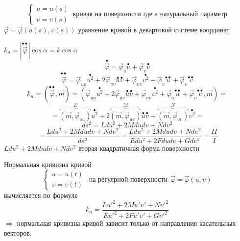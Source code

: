 \begin{define}
  $$
  \left\{
  \begin{array}{c}
    u = u(s) \\
    \upsilon = \upsilon(s)
  \end{array}
  \right. ~ \text{кривая на поверхности где $s$ натуральный параметр}
  $$
  $\vec \varphi = \vec \varphi(u(s), \upsilon(s))$ уравнение кривой в декартовой
  системе координат

  $k_n = |\stackrel{\bullet \bullet}{\vec \varphi}| \cos \alpha = k \cos \alpha$
  $$
  \stackrel{\bullet}{\vec \varphi} = \vec \varphi_u \stackrel{\bullet}{u} +
  \vec \varphi_{\upsilon} \stackrel{\bullet}{\upsilon}
  $$
  $$
  \stackrel{\bullet \bullet}{\vec \varphi} = \vec \varphi_{uu}
  \stackrel{\bullet}{u^2} + 2\vec \varphi_{u\upsilon}\stackrel{\bullet}{u}
  \stackrel{\bullet}{\upsilon} + \vec \varphi_{\upsilon \upsilon}
  \stackrel{\bullet}{\upsilon^2}
  + \vec \varphi_u \stackrel{\bullet \bullet}{u} +
  \vec \varphi_{\upsilon} \stackrel{\bullet \bullet}{\upsilon}
  $$
  $$
  k_n = (\stackrel{\bullet \bullet}{\vec \varphi}, \vec m) = (\vec \varphi_{uu}
  \stackrel{\bullet}{u^2} + 2\vec \varphi_{u\upsilon}\stackrel{\bullet}{u}
  \stackrel{\bullet}{\upsilon} + \vec \varphi_{\upsilon \upsilon}
  \stackrel{\bullet}{\upsilon^2}
  + \vec \varphi_u \stackrel{\bullet \bullet}{u} +
  \vec \varphi_{\upsilon} \stackrel{\bullet \bullet}{\upsilon}, \vec m) =
  $$
  $$
  = \overbrace{(\vec m, \vec \varphi_{uu})}^L \stackrel{\bullet}{u^2} +
  2\overbrace{(\vec m, \vec \varphi_{u\upsilon})}^M \stackrel{\bullet}{u}
  \stackrel{\bullet}{\upsilon} + \overbrace{(\vec m, \vec \varphi_{\upsilon
  \upsilon})}^N \stackrel{\bullet}{\upsilon^2} =
  $$
  $$
  ds^2 = Ldu^2 + 2Mdud\upsilon + Nd\upsilon^2
  $$
  $$
  = \frac{Ldu^2 + 2Mdud\upsilon + Nd\upsilon^2}{ds^2}
  = \frac{Ldu^2 + 2Mdud\upsilon + Nd\upsilon^2}{Edu^2 + 2Fdu d\upsilon +
  Gd\upsilon^2} = \frac{II}{I}
  $$
  $Ldu^2 + 2M dud\upsilon + Nd\upsilon^2$ вторая квадратичная форма поверхности
\end{define}

\begin{block}
  Нормальная кривизна кривой
  $$
  \left\{
  \begin{array}{c}
    u = u(t) \\
    \upsilon = \upsilon(t)
  \end{array}
  \right. ~~ \text{на регулрной поверхности} ~~ \vec \varphi = \vec \varphi(u,
  \upsilon)
  $$
  вычисляется по формуле
  $$
  k_n = \frac{Lu'^2 + 2Mu'\upsilon' + N\upsilon'^2}{Eu'^2 + 2Fu'\upsilon' +
  G\upsilon'^2}
  $$
  $\Rightarrow$ нормальная кривизна кривой зависит
  только от направления касательных векторов.
\end{block}

